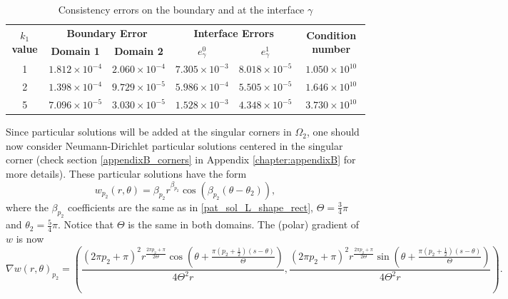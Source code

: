 \begin{table}[!htbp]
    \centering
    \begin{tabular}{cccccc}
      \toprule
      \multirow{2}{*}{\textbf{\(k_1\) value}} & \multicolumn{2}{c}{\textbf{Boundary Error}} & \multicolumn{2}{c}{\textbf{Interface Errors}} & \multirow{2}{*}{\textbf{Condition number}} \\
      \cmidrule(lr){2-3} \cmidrule(lr){4-5}
      & \textbf{Domain 1} & \textbf{Domain 2} & \textbf{\(e_\gamma^0\)} & \textbf{\(e_\gamma^1\)} & \\
      \midrule
      1 & $1.812\times10^{-4}$ & $2.060\times10^{-4}$ & $7.305\times10^{-3}$ & $8.018\times10^{-5}$ & $1.050\times 10^{10}$ \\
      2 & $1.398\times10^{-4}$ & $9.729\times10^{-5}$ & $5.986\times10^{-4}$ & $5.505\times10^{-5}$ & $1.646\times 10^{10}$ \\
      5 & $7.096\times10^{-5}$ & $3.030\times10^{-5}$ & $1.528\times10^{-3}$ & $4.348\times10^{-5}$ & $3.730\times 10^{10}$ \\
      \bottomrule
    \end{tabular}
    \caption{Consistency errors on the boundary and at the interface \(\gamma\)}
    \label{tab:transmission_results_L_shape_axis}
\end{table}

Since particular solutions will be added at the singular corners in \(\Omega_2\), one should now consider Neumann-Dirichlet particular solutions centered in the singular corner (check section \ref{appendixB_corners} in Appendix \ref{chapter:appendixB} for more details). These particular solutions have the form
\[
    w_{p_2}(r,\theta) = \beta_{p_2} r^{\beta_{p_2}}\cos(\beta_{p_2}(\theta-\theta_2)),
\]
where the \(\beta_{p_2}\) coefficients are the same as in \eqref{pat_sol_L_shape_rect}, \(\Theta = \frac{3}{4}\pi\) and \(\theta_2=\frac{5}{4}\pi\). Notice that \(\Theta\) is the same in both domains. The (polar) gradient of \(w\) is now
\begin{equation*}
    \nabla w(r,\theta)_{p_2} = \left(\frac{(2 \pi  {p_2}+\pi )^2 r^{\frac{2 \pi  {p_2}+\pi }{2 \Theta }} \cos \left(\theta +\frac{\pi  \left({p_2}+\frac{1}{2}\right) (s-\theta )}{\Theta }\right)}{4 \Theta ^2 r},\frac{(2 \pi  {p_2}+\pi )^2 r^{\frac{2 \pi  {p_2}+\pi }{2 \Theta }} \sin \left(\theta +\frac{\pi  \left({p_2}+\frac{1}{2}\right) (s-\theta )}{\Theta }\right)}{4 \Theta ^2 r}\right).
\end{equation*}

